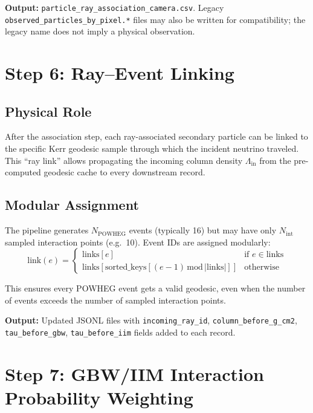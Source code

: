 \documentclass[11pt,a4paper]{article}
\begin{document}
\textbf{Output:} \texttt{particle\_ray\_association\_camera.csv}. Legacy \texttt{observed\_particles\_by\_pixel.*} files may also be written for compatibility; the legacy name does not imply a physical observation.

\section{Step 6: Ray--Event Linking}
\label{sec:ray_link}

\subsection{Physical Role}

After the association step, each ray-associated secondary particle can be linked to the specific Kerr geodesic sample through which the incident neutrino traveled. This ``ray link'' allows propagating the incoming column density $\Lambda_\mathrm{in}$ from the pre-computed geodesic cache to every downstream record.

\subsection{Modular Assignment}

The pipeline generates $N_\mathrm{POWHEG}$ events (typically 16) but may have only $N_\mathrm{int}$ sampled interaction points (e.g.\ 10). Event IDs are assigned modularly:
\begin{equation}
  \text{link}(e) =
  \begin{cases}
    \text{links}[e] & \text{if } e \in \text{links} \\
    \text{links}[\text{sorted\_keys}[(e-1)\,\mathrm{mod}\,|\text{links}|]] & \text{otherwise}
  \end{cases}
  \label{eq:modular}
\end{equation}

This ensures every POWHEG event gets a valid geodesic, even when the number of events exceeds the number of sampled interaction points.

\textbf{Output:} Updated JSONL files with \texttt{incoming\_ray\_id}, \texttt{column\_before\_g\_cm2}, \texttt{tau\_before\_gbw}, \texttt{tau\_before\_iim} fields added to each record.

\section{Step 7: GBW/IIM Interaction Probability Weighting}
\label{sec:weighting}
\end{document}
